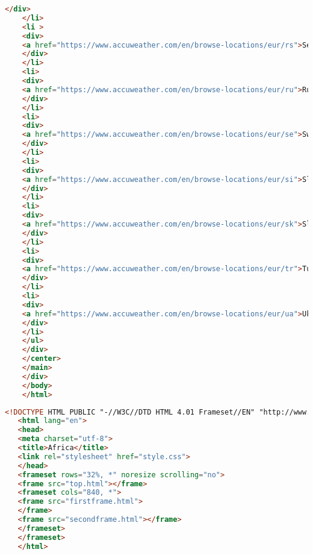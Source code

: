 \begin{lstlisting}[language=HTML,caption=Исходный код страницы Index]
    </div>
    </li>
    <li >
    <div>
    <a href="https://www.accuweather.com/en/browse-locations/eur/rs">Serbia</a>
    </div>
    </li>
    <li>
    <div>
    <a href="https://www.accuweather.com/en/browse-locations/eur/ru">Russia</a>
    </div>
    </li>
    <li>
    <div>
    <a href="https://www.accuweather.com/en/browse-locations/eur/se">Sweden</a>
    </div>
    </li>
    <li>
    <div>
    <a href="https://www.accuweather.com/en/browse-locations/eur/si">Slovenia</a>
    </div>
    </li>
    <li>
    <div>
    <a href="https://www.accuweather.com/en/browse-locations/eur/sk">Slovakia</a>
    </div>
    </li>
    <li>
    <div>
    <a href="https://www.accuweather.com/en/browse-locations/eur/tr">Turkey</a>
    </div>
    </li>
    <li>
    <div>
    <a href="https://www.accuweather.com/en/browse-locations/eur/ua">Ukraine</a>
    </div>
    </li>
    </ul>
    </div>
    </center>
    </main>
    </div>
    </body>
    </html>
\end{lstlisting}


\begin{lstlisting}[language=HTML,caption=Исходный код страницы Africa]
   <!DOCTYPE HTML PUBLIC "-//W3C//DTD HTML 4.01 Frameset//EN" "http://www.w3.org/TR/html4/frameset.dtd">
   <html lang="en">
   <head>
   <meta charset="utf-8">
   <title>Africa</title>
   <link rel="stylesheet" href="style.css">
   </head>
   <frameset rows="32%, *" noresize scrolling="no">
   <frame src="top.html"></frame>
   <frameset cols="840, *">
   <frame src="firstframe.html">
   </frame>
   <frame src="secondframe.html"></frame>
   </frameset>
   </frameset>
   </html>
\end{lstlisting}


